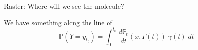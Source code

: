 \begin{frame}{Raster: Where will we see the molecule?}

We have something along the line of
\[\mathds{P}(Y = y_{t_{0}}) = \int_{0}^{t_{0}} \frac{d \mathds{P}_{t}}{dt}(x, \Gamma(t)) \vert \gamma(t)\vert dt\]
\end{frame}